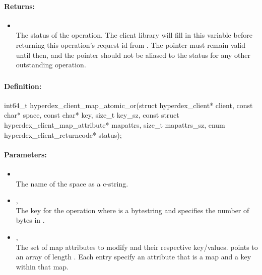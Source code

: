 \paragraph{Returns:}
\begin{itemize}[noitemsep]
\item {}\\
The status of the operation.  The client library will fill in this variable before returning this operation's request id from .  The pointer must remain valid until then, and the pointer should not be aliased to the status for any other outstanding operation.
\end{itemize}

\pagebreak
\subsubsection{}
\label{api:c:map_atomic_or}


\paragraph{Definition:}
\begin{ccode}
int64_t hyperdex_client_map_atomic_or(struct hyperdex_client* client,
        const char* space,
        const char* key, size_t key_sz,
        const struct hyperdex_client_map_attribute* mapattrs, size_t mapattrs_sz,
        enum hyperdex_client_returncode* status);
\end{ccode}

\paragraph{Parameters:}
\begin{itemize}[noitemsep]
\item {}\\
The name of the space as a c-string.
\item {}, \\
The key for the operation where  is a bytestring and  specifies the number of bytes in .
\item {}, \\
The set of map attributes to modify and their respective key/values.   points to an array of length .  Each entry specify an attribute that is a map and a key within that map.
\end{itemize}

